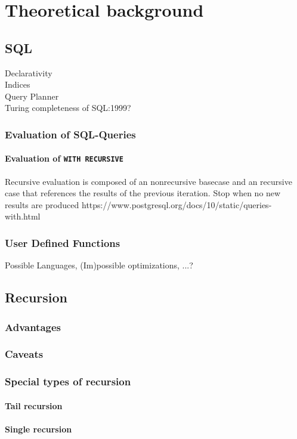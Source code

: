\chapter{Theoretical background}\label{Introduction}
\section{SQL}\label{theory}
Declarativity\\
Indices\\
Query Planner\\
Turing completeness of SQL:1999?

\subsection{Evaluation of SQL-Queries}
\subsubsection{Evaluation of \texttt{WITH RECURSIVE}}
Recursive evaluation is composed of an nonrecursive basecase and an recursive case that references the results of the previous iteration.
Stop when no new results are produced
https://www.postgresql.org/docs/10/static/queries-with.html

\subsection{User Defined Functions}
Possible Languages, (Im)possible optimizations, ...?

\section{Recursion}
\subsection{Advantages}
\subsection{Caveats}
\subsection{Special types of recursion}
\subsubsection{Tail recursion}
\subsubsection{Single recursion}